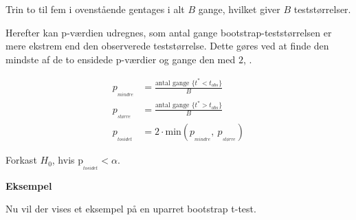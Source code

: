 \documentclass[
]{book}
\theoremstyle{definition}
\theoremstyle{definition}
\theoremstyle{definition}
\theoremstyle{remark}
\begin{document}
Trin to til fem i ovenstående gentages i alt \(B\) gange, hvilket giver \(B\) teststørrelser.

Herefter kan p-værdien udregnes, som antal gange bootstrap-teststørrelsen er mere ekstrem end den observerede teststørrelse. Dette gøres ved at finde den mindste af de to ensidede p-værdier og gange den med \(2\), \citep{Hypo_test}.

\begin{align}
p_{_{mindre}} &= \frac{\text{antal gange }\{t^*<t_{obs}\}}{B} \\
p_{_{større}} &= \frac{\text{antal gange }\{t^*>t_{obs}\}}{B} \\
p_{_{tosidet}} &= 2 \cdot \text{min}(p_{_{mindre}},~p_{_{større}})
\end{align}

Forkast \(H_0\), hvis \(\text{p}_{_{tosidet}}<\alpha\).

\textbf{Eksempel}

Nu vil der vises et eksempel på en uparret bootstrap t-test.
\end{document}
